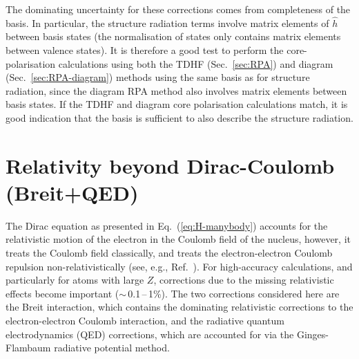 \documentclass[10pt,twocolumn,a4paper]{article}%
\newcommand{\sixjs}[6]{\renewcommand\arraystretch{0.75}\ensuremath{\begin{Bmatrix}#1~#2~#3\\#4~#5~#6\end{Bmatrix}}}	%
\def\en{\ensuremath{\varepsilon}}
\begin{document}






The dominating uncertainty for these corrections comes from completeness of the basis.
In particular, the structure radiation terms involve matrix elements of $\hat h$ between basis states (the normalisation of states only contains matrix elements between valence states).
It is therefore a good test to perform the core-polarisation calculations using both the TDHF (Sec.~\ref{sec:RPA}) and diagram (Sec.~\ref{sec:RPA-diagram}) methods using the same basis as for structure radiation, since the diagram RPA method also involves matrix elements between basis states.
If the TDHF and diagram core polarisation calculations match, it is good indication that the basis is sufficient to also describe the structure radiation.




\section{Relativity beyond Dirac-Coulomb (Breit+QED)}


The Dirac equation as presented in Eq.~(\ref{eq:H-manybody})
accounts for the relativistic motion of the electron in the Coulomb field of the nucleus, however, it treats the Coulomb field classically, and treats the electron-electron Coulomb repulsion non-relativistically (see, e.g., Ref.~\cite{BetheBook}).
For high-accuracy calculations, and particularly for atoms with large $Z$, corrections due to the missing relativistic effects become important ($\sim$\,0.1\,--\,1\%).
The two corrections considered here are the
Breit interaction, which contains the dominating relativistic corrections to the electron-electron Coulomb interaction, and 
the radiative quantum electrodynamics (QED) corrections, which are accounted for via the Ginges-Flambaum radiative potential method.
\end{document}
